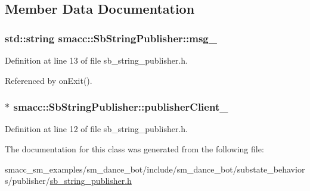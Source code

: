 \subsection{Member Data Documentation}
\subsubsection[{\texorpdfstring{msg\+\_\+}{msg_}}]{\setlength{\rightskip}{0pt plus 5cm}std\+::string smacc\+::\+Sb\+String\+Publisher\+::msg\+\_\+}\hypertarget{classsmacc_1_1SbStringPublisher_ad3397fa2bb3097192c3f82d243704741}{}\label{classsmacc_1_1SbStringPublisher_ad3397fa2bb3097192c3f82d243704741}


Definition at line 13 of file sb\+\_\+string\+\_\+publisher.\+h.



Referenced by on\+Exit().

\subsubsection[{\texorpdfstring{publisher\+Client\+\_\+}{publisherClient_}}]{$\ast$ smacc\+::\+Sb\+String\+Publisher\+::publisher\+Client\+\_\+}\hypertarget{classsmacc_1_1SbStringPublisher_a447bf4a72903d9bf0ed7583dee3d09b2}{}\label{classsmacc_1_1SbStringPublisher_a447bf4a72903d9bf0ed7583dee3d09b2}


Definition at line 12 of file sb\+\_\+string\+\_\+publisher.\+h.



The documentation for this class was generated from the following file\+:\begin{DoxyCompactItemize}
\item 
smacc\+\_\+sm\+\_\+examples/sm\+\_\+dance\+\_\+bot/include/sm\+\_\+dance\+\_\+bot/substate\+\_\+behaviors/publisher/\hyperlink{sb__string__publisher_8h}{sb\+\_\+string\+\_\+publisher.\+h}\end{DoxyCompactItemize}
